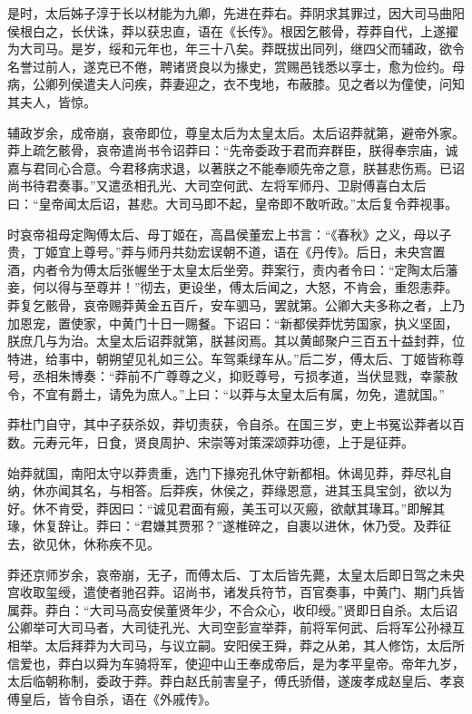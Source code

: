 \documentclass[]{article}
\begin{document}
是时，太后姊子淳于长以材能为九卿，先进在莽右。莽阴求其罪过，因大司马曲阳侯根白之，长伏诛，莽以获忠直，语在《长传》。根因乞骸骨，荐莽自代，上遂擢为大司马。是岁，绥和元年也，年三十八矣。莽既拔出同列，继四父而辅政，欲令名誉过前人，遂克已不倦，聘诸贤良以为掾史，赏赐邑钱悉以享士，愈为俭约。母病，公卿列侯遣夫人问疾，莽妻迎之，衣不曳地，布蔽膝。见之者以为僮使，问知其夫人，皆惊。

辅政岁余，成帝崩，哀帝即位，尊皇太后为太皇太后。太后诏莽就第，避帝外家。莽上疏乞骸骨，哀帝遣尚书令诏莽曰：``先帝委政于君而弃群臣，朕得奉宗庙，诚嘉与君同心合意。今君移病求退，以著朕之不能奉顺先帝之意，朕甚悲伤焉。已诏尚书待君奏事。''又遣丞相孔光、大司空何武、左将军师丹、卫尉傅喜白太后曰：``皇帝闻太后诏，甚悲。大司马即不起，皇帝即不敢听政。''太后复令莽视事。

时哀帝祖母定陶傅太后、母丁姬在，高昌侯董宏上书言：``《春秋》之义，母以子贵，丁姬宜上尊号。''莽与师丹共劾宏误朝不道，语在《丹传》。后日，未央宫置酒，内者令为傅太后张幄坐于太皇太后坐旁。莽案行，责内者令曰：``定陶太后藩妾，何以得与至尊并！''彻去，更设坐，傅太后闻之，大怒，不肯会，重怨恚莽。莽复乞骸骨，哀帝赐莽黄金五百斤，安车驷马，罢就第。公卿大夫多称之者，上乃加恩宠，置使家，中黄门十日一赐餐。下诏曰：``新都侯莽忧劳国家，执义坚固，朕庶几与为治。太皇太后诏莽就第，朕甚闵焉。其以黄邮聚户三百五十益封莽，位特进，给事中，朝朔望见礼如三公。车驾乘绿车从。''后二岁，傅太后、丁姬皆称尊号，丞相朱博奏：``莽前不广尊尊之义，抑贬尊号，亏损孝道，当伏显戮，幸蒙赦令，不宜有爵土，请免为庶人。''上曰：``以莽与太皇太后有属，勿免，遣就国。''

莽杜门自守，其中子获杀奴，莽切责获，令自杀。在国三岁，吏上书冤讼莽者以百数。元寿元年，日食，贤良周护、宋崇等对策深颂莽功德，上于是征莽。

始莽就国，南阳太守以莽贵重，选门下掾宛孔休守新都相。休谒见莽，莽尽礼自纳，休亦闻其名，与相答。后莽疾，休侯之，莽缘恩意，进其玉具宝剑，欲以为好。休不肯受，莽因曰：``诚见君面有瘢，美玉可以灭瘢，欲献其瑑耳。''即解其瑑，休复辞让。莽曰：``君嫌其贾邪？''遂椎碎之，自裹以进休，休乃受。及莽征去，欲见休，休称疾不见。

莽还京师岁余，哀帝崩，无子，而傅太后、丁太后皆先薨，太皇太后即日驾之未央宫收取玺绶，遣使者驰召莽。诏尚书，诸发兵符节，百官奏事，中黄门、期门兵皆属莽。莽白：``大司马高安侯董贤年少，不合众心，收印绶。''贤即日自杀。太后诏公卿举可大司马者，大司徒孔光、大司空彭宣举莽，前将军何武、后将军公孙禄互相举。太后拜莽为大司马，与议立嗣。安阳侯王舜，莽之从弟，其人修饬，太后所信爱也，莽白以舜为车骑将军，使迎中山王奉成帝后，是为孝平皇帝。帝年九岁，太后临朝称制，委政于莽。莽白赵氏前害皇子，傅氏骄僣，遂废孝成赵皇后、孝哀傅皇后，皆令自杀，语在《外戚传》。
\end{document}
